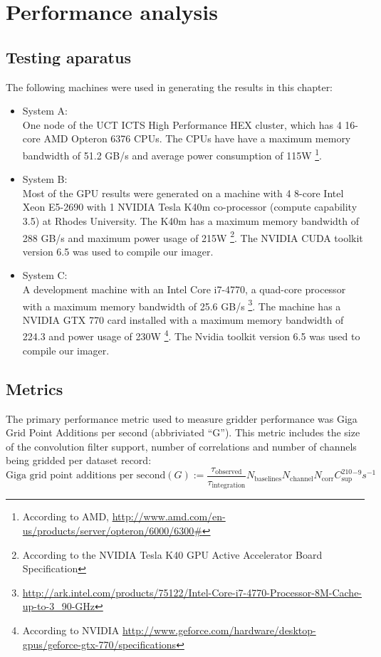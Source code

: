 \chapter{Performance analysis}
\section{Testing aparatus}
The following machines were used in generating the results in this chapter:
\begin{itemize}
 \item System A:\\
 One node of the UCT ICTS High Performance HEX cluster, which has 4 16-core AMD Opteron 6376 CPUs. The CPUs have have a maximum memory bandwidth of 
 51.2 GB/s and average power consumption of 115W \footnote{According to AMD, \url{http://www.amd.com/en-us/products/server/opteron/6000/6300\#}}.
 \item System B:\\
 Most of the GPU results were generated on a machine with 4 8-core Intel Xeon E5-2690 with 1 NVIDIA Tesla K40m co-processor (compute capability 3.5) at Rhodes University. The K40m has a maximum
 memory bandwidth of 288 GB/s and maximum power usage of 215W \footnote{According to the NVIDIA Tesla K40 GPU Active Accelerator Board Specification}. The NVIDIA CUDA toolkit 
 version 6.5 was used to compile our imager. 
 \item System C:\\
 A development machine with an Intel Core i7-4770, a quad-core processor with a maximum memory bandwidth of 25.6 GB/s \footnote{\url{http://ark.intel.com/products/75122/Intel-Core-i7-4770-Processor-8M-Cache-up-to-3_90-GHz}}. 
 The machine has a NVIDIA GTX 770 card installed with a maximum memory bandwidth of 224.3 and power usage of 
 230W \footnote{According to NVIDIA \url{http://www.geforce.com/hardware/desktop-gpus/geforce-gtx-770/specifications}}. The Nvidia toolkit version 6.5 was used to compile our imager.
\end{itemize}

\section{Metrics}
The primary performance metric used to measure gridder performance was Giga Grid Point Additions per second (abbriviated ``G''). This metric includes the size of the
convolution filter support, number of correlations and number of channels being gridded per dataset record:
\begin{equation}
 \text{Giga grid point additions per second} (G) := \frac{\tau_\text{observed}}{\tau_\text{integration}}N_\text{baselines}N_\text{channel}N_\text{corr}C_\text{sup}^210^{-9}s^{-1}
\end{equation}

